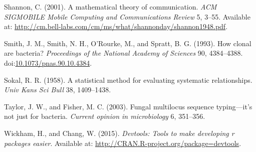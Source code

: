 \documentclass{frontiersSCNS} %
\begin{document}
Shannon, C. (2001). A mathematical theory of communication. \emph{ACM
SIGMOBILE Mobile Computing and Communications Review} 5, 3--55.
Available at:
\url{http://cm.bell-labs.com/cm/ms/what/shannonday/shannon1948.pdf}.

Smith, J. M., Smith, N. H., O'Rourke, M., and Spratt, B. G. (1993). How
clonal are bacteria? \emph{Proceedings of the National Academy of
Sciences} 90, 4384--4388.
doi:\href{http://dx.doi.org/10.1073/pnas.90.10.4384}{10.1073/pnas.90.10.4384}.

Sokal, R. R. (1958). A statistical method for evaluating systematic
relationships. \emph{Univ Kans Sci Bull} 38, 1409--1438.

Taylor, J. W., and Fisher, M. C. (2003). Fungal multilocus sequence
typing---it's not just for bacteria. \emph{Current opinion in
microbiology} 6, 351--356.

Wickham, H., and Chang, W. (2015). \emph{Devtools: Tools to make
developing r packages easier}. Available at:
\url{http://CRAN.R-project.org/package=devtools}.
\end{document}

